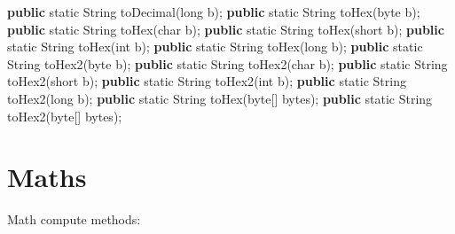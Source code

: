 \documentclass[
]{book}
\newenvironment{Shaded}{\begin{snugshade}}{\end{snugshade}}
\newcommand{\BuiltInTok}[1]{#1}
\newcommand{\DataTypeTok}[1]{\textcolor[rgb]{0.13,0.29,0.53}{#1}}
\newcommand{\FunctionTok}[1]{\textcolor[rgb]{0.00,0.00,0.00}{#1}}
\newcommand{\KeywordTok}[1]{\textcolor[rgb]{0.13,0.29,0.53}{\textbf{#1}}}
\newcommand{\NormalTok}[1]{#1}
\begin{document}
\begin{Shaded}
\begin{Highlighting}[]
\KeywordTok{public} \DataTypeTok{static} \BuiltInTok{String} \FunctionTok{toDecimal}\NormalTok{(}\DataTypeTok{long}\NormalTok{ b);}
\KeywordTok{public} \DataTypeTok{static} \BuiltInTok{String} \FunctionTok{toHex}\NormalTok{(}\DataTypeTok{byte}\NormalTok{ b);}
\KeywordTok{public} \DataTypeTok{static} \BuiltInTok{String} \FunctionTok{toHex}\NormalTok{(}\DataTypeTok{char}\NormalTok{ b);}
\KeywordTok{public} \DataTypeTok{static} \BuiltInTok{String} \FunctionTok{toHex}\NormalTok{(}\DataTypeTok{short}\NormalTok{ b);}
\KeywordTok{public} \DataTypeTok{static} \BuiltInTok{String} \FunctionTok{toHex}\NormalTok{(}\DataTypeTok{int}\NormalTok{ b);}
\KeywordTok{public} \DataTypeTok{static} \BuiltInTok{String} \FunctionTok{toHex}\NormalTok{(}\DataTypeTok{long}\NormalTok{ b);}
\KeywordTok{public} \DataTypeTok{static} \BuiltInTok{String} \FunctionTok{toHex2}\NormalTok{(}\DataTypeTok{byte}\NormalTok{ b);}
\KeywordTok{public} \DataTypeTok{static} \BuiltInTok{String} \FunctionTok{toHex2}\NormalTok{(}\DataTypeTok{char}\NormalTok{ b);}
\KeywordTok{public} \DataTypeTok{static} \BuiltInTok{String} \FunctionTok{toHex2}\NormalTok{(}\DataTypeTok{short}\NormalTok{ b);}
\KeywordTok{public} \DataTypeTok{static} \BuiltInTok{String} \FunctionTok{toHex2}\NormalTok{(}\DataTypeTok{int}\NormalTok{ b);}
\KeywordTok{public} \DataTypeTok{static} \BuiltInTok{String} \FunctionTok{toHex2}\NormalTok{(}\DataTypeTok{long}\NormalTok{ b);}
\KeywordTok{public} \DataTypeTok{static} \BuiltInTok{String} \FunctionTok{toHex}\NormalTok{(}\DataTypeTok{byte}\NormalTok{[] bytes);}
\KeywordTok{public} \DataTypeTok{static} \BuiltInTok{String} \FunctionTok{toHex2}\NormalTok{(}\DataTypeTok{byte}\NormalTok{[] bytes);}
\end{Highlighting}
\end{Shaded}

\hypertarget{langx-java_references_utils_Maths}{%
\section{Maths}\label{langx-java_references_utils_Maths}}

Math compute methods:
\end{document}
